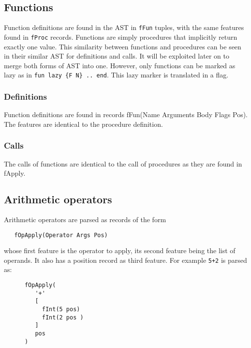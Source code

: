 \documentclass[a4paper]{memoir}
\begin{document}
\subsection{Functions}\label{sec:input:functions}
Function definitions are found in the AST in \lstinline!fFun! tuples, with the
same features found in \lstinline!fProc! records. Functions are simply
procedures that implicitly return exactly one value. This similarity between
functions and procedures can be seen in their similar AST for definitions and
calls. It will be exploited later on to merge both forms of AST
into one.
However, only functions can be marked as lazy as in \lstinline!fun lazy {F N} .. end!. This lazy marker is translated in a flag.
\subsubsection{Definitions}
Function definitions are found in records fFun(Name Arguments Body Flags Pos). The features are identical to the procedure definition.
\subsubsection{Calls}
The calls of functions are identical to the call of procedures as they are found in fApply.

\subsection{Arithmetic operators}\label{sec:input:operators}
Arithmetic operators are parsed as records of the form
\begin{lstlisting}
   fOpApply(Operator Args Pos)
\end{lstlisting}
 whose first feature is the operator to
apply, its second feature being the list of operands. It also has a position
record as third feature. For example
\lstinline!5+2! is parsed as:
\begin{lstlisting}
      fOpApply(
         '+'
         [
           fInt(5 pos)
           fInt(2 pos )
         ]
         pos
      )
\end{lstlisting}
\end{document}

